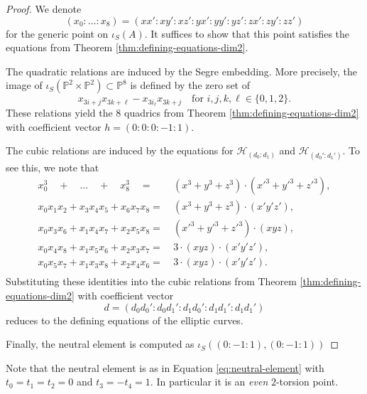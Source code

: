 \documentclass[11pt]{amsart}
\theoremstyle{definition}
\renewcommand{\H}{\mathcal{H}}
\newcommand{\HH}{\mathcal{H}}
\let \H\HH
\newcommand{\PP}{\mathbb{P}}
\begin{document}
\begin{proof}
   We denote
    \[
    (x_0: \dots: x_8) = (xx':xy':xz':yx':yy':yz':zx':zy':zz')
    \]
    for the generic point on $\iota_S(A)$. It suffices to show that this point satisfies the equations from Theorem \ref{thm:defining-equations-dim2}.

    The quadratic relations are induced by the Segre embedding. More precisely, the image of $\iota_S(\PP^2 \times \PP^2) \subset \PP^8$ is defined by the zero set of 
    \[
    x_{3i+j}x_{3k+\ell} - x_{3i_\ell}x_{3k+j} \quad \text{for } i,j,k,\ell \in \{0,1,2\}. 
    \]
    These relations yield the $8$ quadrics from Theorem  \ref{thm:defining-equations-dim2} with coefficient vector $h = (0:0:0:-1:1)$.

    The cubic relations are induced by the equations for $\H_{(d_0:d_1)}$ and $\H_{(d_0':d_1')}$. To see this, we note that 
    \begin{align*}
    x_0^3 \quad + \quad \dots \quad+ \quad  x_8^3\quad =&~ (x^3 + y^3 + z^3) \cdot (x'^3 + y'^3 + z'^3),\\
    x_0x_1x_2 + x_3x_4x_5 + x_6x_7x_8= &~ (x^3+y^3+z^3) \cdot (x'y'z'),\\
    x_0x_3x_6 + x_1x_4 x_7 + x_2x_5x_8 = &~ (x'^3+y'^3+z'^3) \cdot (xyz),\\
    x_0x_4x_8 + x_1x_5x_6 + x_2x_3x_7 = &~ 3 \cdot (xyz) \cdot (x'y'z'),\\
    x_0x_5x_7 + x_1x_3x_8 + x_2x_4x_6 = &~ 3 \cdot (xyz) \cdot (x'y'z').\\
    \end{align*}
    Substituting these identities into the cubic relations from Theorem  \ref{thm:defining-equations-dim2} with coefficient vector 
    \[
    d = (d_0d_0': d_0d_1': d_1d_0':d_1d_1':d_1d_1')
    \]
    reduces to the defining equations of the elliptic curves.

    Finally, the neutral element is computed as $\iota_S\left((0:-1:1),(0:-1:1)\right)$
\end{proof}

Note that the neutral element is as in Equation \ref{eq:neutral-element} with $t_0 = t_1 = t_2 = 0$ and $t_3 = - t_4 = 1$. In particular it is an {\em even} $2$-torsion point.
\end{document}
